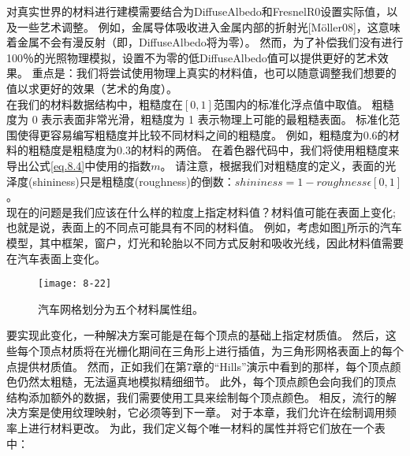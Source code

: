 \begin{flushleft}
对真实世界的材料进行建模需要结合为DiffuseAlbedo和FresnelR0设置实际值，以及一些艺术调整。 例如，金属导体吸收进入金属内部的折射光[Möller08]，这意味着金属不会有漫反射（即，DiffuseAlbedo将为零）。 然而，为了补偿我们没有进行100％的光照物理模拟，设置不为零的低DiffuseAlbedo值可以提供更好的艺术效果。 重点是：我们将尝试使用物理上真实的材料值，也可以随意调整我们想要的值以求更好的效果（艺术的角度）。\\
在我们的材料数据结构中，粗糙度在$[0,1]$范围内的标准化浮点值中取值。 粗糙度为 0 表示表面非常光滑，粗糙度为 1 表示物理上可能的最粗糙表面。 标准化范围使得更容易编写粗糙度并比较不同材料之间的粗糙度。 例如，粗糙度为0.6的材料的粗糙度是粗糙度为0.3的材料的两倍。 在着色器代码中，我们将使用粗糙度来导出公式\ref{eq.8.4}中使用的指数$m$。 请注意，根据我们对粗糙度的定义，表面的光泽度(shininess)只是粗糙度(roughness)的倒数：$shininess=1-roughness \epsilon [0,1]$。\\

现在的问题是我们应该在什么样的粒度上指定材料值？材料值可能在表面上变化; 也就是说，表面上的不同点可能具有不同的材料值。 例如，考虑如图\ref{fig:8-22}所示的汽车模型，其中框架，窗户，灯光和轮胎以不同方式反射和吸收光线，因此材料值需要在汽车表面上变化。
\end{flushleft}

\begin{figure}[h]
    \label{fig:8-22}
    \texttt{[image: 8-22]}
    \centering
    \caption{汽车网格划分为五个材料属性组。}
\end{figure}

\begin{flushleft}
要实现此变化，一种解决方案可能是在每个顶点的基础上指定材质值。 然后，这些每个顶点材质将在光栅化期间在三角形上进行插值，为三角形网格表面上的每个点提供材质值。 然而，正如我们在第7章的“Hills”演示中看到的那样，每个顶点颜色仍然太粗糙，无法逼真地模拟精细细节。 此外，每个顶点颜色会向我们的顶点结构添加额外的数据，我们需要使用工具来绘制每个顶点颜色。 相反，流行的解决方案是使用纹理映射，它必须等到下一章。 对于本章，我们允许在绘制调用频率上进行材料更改。 为此，我们定义每个唯一材料的属性并将它们放在一个表中：\\
\end{flushleft}

